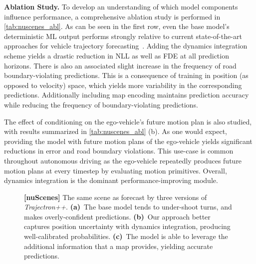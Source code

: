 \documentclass[runningheads]{llncs}
\newcommand{\algname}{\mbox{Trajectron++}}
\newcommand{\emphalgname}{\emph{\algname}}
\begin{document}
{\bf Ablation Study.} To develop an understanding of which model components influence performance, a comprehensive ablation study is performed in \cref{tab:nuscenes_abl}.
As can be seen in the first row,
even the base model's deterministic ML output performs strongly relative to current state-of-the-art approaches for vehicle trajectory forecasting~\cite{CasasGulinoEtAl2019}. 
Adding the dynamics integration scheme yields a drastic reduction in NLL as well as FDE at all prediction horizons. There is also an associated slight increase in the frequency of road boundary-violating predictions. This is a consequence of training in position (as opposed to velocity) space, which yields more variability in the corresponding predictions.
Additionally including map encoding maintains prediction accuracy while reducing the frequency of boundary-violating predictions.


The effect of conditioning on the ego-vehicle's future motion plan is also studied, with results summarized in \cref{tab:nuscenes_abl} (b). 
As one would expect, providing the model with future motion plans of the ego-vehicle yields significant reductions in error and road boundary violations. 
This use-case is common throughout autonomous driving as the ego-vehicle repeatedly produces future motion plans at every timestep by evaluating motion primitives. Overall, dynamics integration is the dominant performance-improving module.



\begin{figure}[t]
    \centering
{}
\caption{\textbf{[nuScenes]} The same scene as forecast by three versions of \emphalgname{}. \textbf{(a)}~The base model tends to under-shoot turns, and makes overly-confident predictions. 
    \textbf{(b)}~Our approach better captures position uncertainty with dynamics integration, producing well-calibrated probabilities.
    \textbf{(c)}~The model is able to leverage the additional information that a map provides, yielding accurate predictions.}
\label{fig:nuscenes_map_quali}
    \label{fig:nuscenes_robot_quali}
\end{figure}
\end{document}
